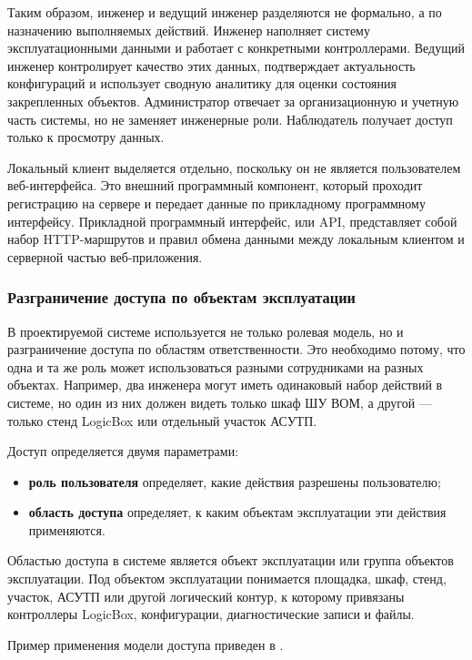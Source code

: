 Таким образом, инженер и ведущий инженер разделяются не формально, а по назначению выполняемых действий. Инженер наполняет систему эксплуатационными данными и работает с конкретными контроллерами. Ведущий инженер контролирует качество этих данных, подтверждает актуальность конфигураций и использует сводную аналитику для оценки состояния закрепленных объектов. Администратор отвечает за организационную и учетную часть системы, но не заменяет инженерные роли. Наблюдатель получает доступ только к просмотру данных.

Локальный клиент выделяется отдельно, поскольку он не является пользователем веб-интерфейса. Это внешний программный компонент, который проходит регистрацию на сервере и передает данные по прикладному программному интерфейсу. Прикладной программный интерфейс, или API, представляет собой набор HTTP-маршрутов и правил обмена данными между локальным клиентом и серверной частью веб-приложения.

\subsubsection{Разграничение доступа по объектам эксплуатации}

В проектируемой системе используется не только ролевая модель, но и разграничение доступа по областям ответственности. Это необходимо потому, что одна и та же роль может использоваться разными сотрудниками на разных объектах. Например, два инженера могут иметь одинаковый набор действий в системе, но один из них должен видеть только шкаф ШУ ВОМ, а другой --- только стенд LogicBox или отдельный участок АСУТП.

Доступ определяется двумя параметрами:
\begin{itemize}
	\item \textbf{роль пользователя} определяет, какие действия разрешены пользователю;
	\item \textbf{область доступа} определяет, к каким объектам эксплуатации эти действия применяются.
\end{itemize}

Областью доступа в системе является объект эксплуатации или группа объектов эксплуатации. Под объектом эксплуатации понимается площадка, шкаф, стенд, участок, АСУТП или другой логический контур, к которому привязаны контроллеры LogicBox, конфигурации, диагностические записи и файлы.

Пример применения модели доступа приведен в .

